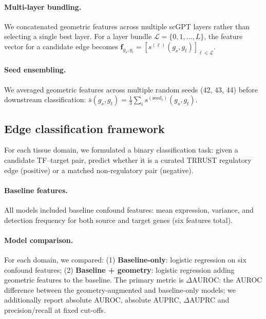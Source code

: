 \documentclass[11pt]{article}
\newcommand{\DAURC}{\Delta\mathrm{AUROC}}
\begin{document}
\paragraph{Multi-layer bundling.}
We concatenated geometric features across multiple scGPT layers rather than selecting a single best layer.
For a layer bundle $\mathcal{L} = \{0, 1, \ldots, L\}$, the feature vector for a candidate edge becomes $\mathbf{f}_{g_s, g_t} = [s^{(\ell)}(g_s, g_t)]_{\ell \in \mathcal{L}}$.

\paragraph{Seed ensembling.}
We averaged geometric features across multiple random seeds (42, 43, 44) before downstream classification:
$\bar{s}(g_s, g_t) = \frac{1}{3}\sum_{i} s^{(\text{seed}_i)}(g_s, g_t)$.

\subsection*{Edge classification framework}

For each tissue domain, we formulated a binary classification task: given a candidate TF--target pair, predict whether it is a curated TRRUST regulatory edge (positive) or a matched non-regulatory pair (negative).

\paragraph{Baseline features.}
All models included baseline confound features: mean expression, variance, and detection frequency for both source and target genes (six features total).

\paragraph{Model comparison.}
For each domain, we compared: (1) \textbf{Baseline-only}: logistic regression on six confound features; (2) \textbf{Baseline + geometry}: logistic regression adding geometric features to the baseline.
The primary metric is $\DAURC$: the AUROC difference between the geometry-augmented and baseline-only models; we additionally report absolute AUROC, absolute AUPRC, $\Delta$AUPRC and precision/recall at fixed cut-offs.
\end{document}
